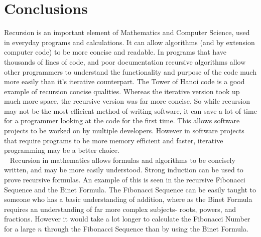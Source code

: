 \documentclass{article}
\begin{document}
\section{Conclusions}
Recursion is an important element of Mathematics and Computer Science, used in everyday programs and calculations.  It can allow algorithms (and by extension computer code) to be more concise and readable.  In programs that have thousands of lines of code, and poor documentation recursive algorithms allow other programmers to understand the functionality and purpose of the code much more easily than it's iterative counterpart.  The Tower of Hanoi code is a good example of recursion concise qualities.  Whereas the iterative version took up much more space, the recursive version was far more concise. So while recursion may not be the most efficient method of writing software, it can save a lot of time for a programmer looking at the code for the first time.  This allows software projects to be worked on by multiple developers.  However in software projects that require programs to be more memory efficient and faster, iterative programming may be a better choice.  \\~
Recursion in mathematics  allows formulas and algorithms to be concisely written, and may be more easily understood.  Strong induction can be used to prove recursive formulas.  An example of this is seen in the recursive Fibonacci Sequence and the Binet Formula. The Fibonacci Sequence can be easily taught to someone who has a basic understanding of addition, where as the Binet Formula requires an understanding of far more complex subjects- roots, powers, and fractions.  However it would take a lot longer to calculate the Fibonacci Number for a large $n$ through the Fibonacci Sequence than by using the Binet Formula.  

\begin{comment} Further on, it is not purely a mathematical construct, it has appearances in nature too.  Snowflake patterns, crystals, and leaf patterns contain fractals which are recursive patterns. If you put two mirrors parallel to each other, an infinite number of nested images are created.  This is an example of infinite recursion in nature. Although there are non recursive ways to implement otherwise Recursive formulas and/or programs, it is more inefficient to use the non recursive formula in certain cases, than it is to use the recursive, as evidenced by the Binet Formula and the Fibonacci Formula.\end{comment}
\end{document}
